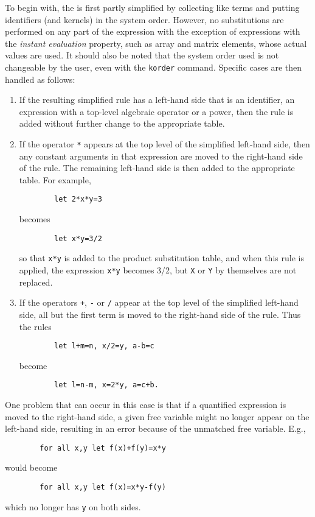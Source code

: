 To begin with, the  is first partly
simplified by collecting like terms and putting identifiers (and kernels)
in the system order.  However, no substitutions are performed on any part
of the expression with the exception of expressions with the \emph{instant
evaluation} property, such as array and matrix elements, whose actual
values are used.  It should also be noted that the system order used is
not changeable by the user, even with the \texttt{korder} command.  Specific
cases are then handled as follows:
\begin{enumerate}
\item If the resulting simplified rule has a left-hand side that is an
identifier, an expression with a top-level algebraic operator or a power,
then the rule is added without further change to the appropriate table.

\item If the operator \texttt{*} appears at the top level of the simplified left-hand
side, then any constant arguments in that expression are moved to the
right-hand side of the rule.  The remaining left-hand side is then added
to the appropriate table.  For example,
\begin{verbatim}
        let 2*x*y=3
\end{verbatim}
becomes
\begin{verbatim}
        let x*y=3/2
\end{verbatim}
so that \texttt{x*y} is added to the product substitution table, and when
this rule is applied, the expression \texttt{x*y} becomes 3/2, but \texttt{X} or
\texttt{Y} by themselves are not replaced.

\item If the operators \texttt{+}, \texttt{-} or \texttt{/} appear at the top level
of the simplified left-hand side, all but the first term is moved to the
right-hand side of the rule.  Thus the rules
\begin{verbatim}
        let l+m=n, x/2=y, a-b=c
\end{verbatim}
become
\begin{verbatim}
        let l=n-m, x=2*y, a=c+b.
\end{verbatim}
\end{enumerate}
One problem that can occur in this case is that if a quantified expression
is moved to the right-hand side, a given free variable might no longer
appear on the left-hand side, resulting in an error because of the
unmatched free variable. E.g.,
\begin{verbatim}
        for all x,y let f(x)+f(y)=x*y
\end{verbatim}
would become
\begin{verbatim}
        for all x,y let f(x)=x*y-f(y)
\end{verbatim}
which no longer has \texttt{y} on both sides.

